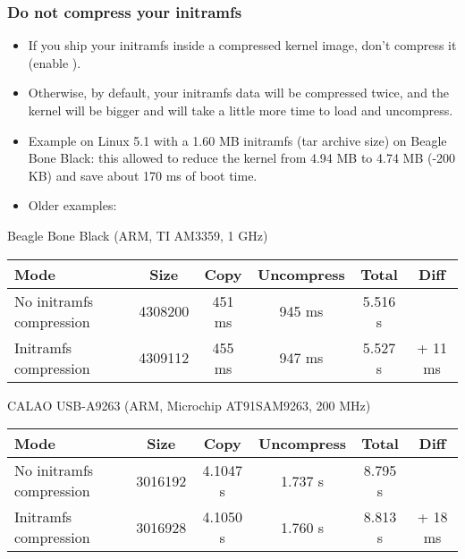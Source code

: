 \begin{frame}
\frametitle{Do not compress your initramfs}
\begin{itemize}
\item If you ship your initramfs inside a compressed kernel image, don't compress
      it \\
      (enable ).
\item Otherwise, by default, your initramfs data will be compressed twice, and
      the kernel will be bigger and will take a little more time to load
      and uncompress.
\item Example on Linux 5.1 with a 1.60 MB initramfs (tar archive size) 
      on Beagle Bone Black: this allowed to reduce the kernel from 4.94 
      MB to 4.74 MB (-200 KB) and save about 170 ms of boot time.
\item Older examples:
\end{itemize}
\scriptsize
Beagle Bone Black (ARM, TI AM3359, 1 GHz)
\begin{tabular}{| l || c | c | c | c | c | }
\hline
Mode & Size & Copy & Uncompress & Total & Diff \\
\hline
No initramfs compression & 4308200 & 451 ms & 945 ms & 5.516 s & \\
Initramfs compression & 4309112 & 455 ms & 947 ms & 5.527 s & + 11 ms \\
\hline
\end{tabular}
\newline\newline
CALAO USB-A9263 (ARM, Microchip AT91SAM9263, 200 MHz)
\begin{tabular}{| l || c | c | c | c | c | }
\hline
Mode & Size & Copy & Uncompress & Total & Diff \\
\hline
No initramfs compression & 3016192 & 4.1047 s & 1.737 s & 8.795 s & \\
Initramfs compression & 3016928 & 4.1050 s & 1.760 s  & 8.813 s & + 18 ms \\
\hline
\end{tabular}
\end{frame}
